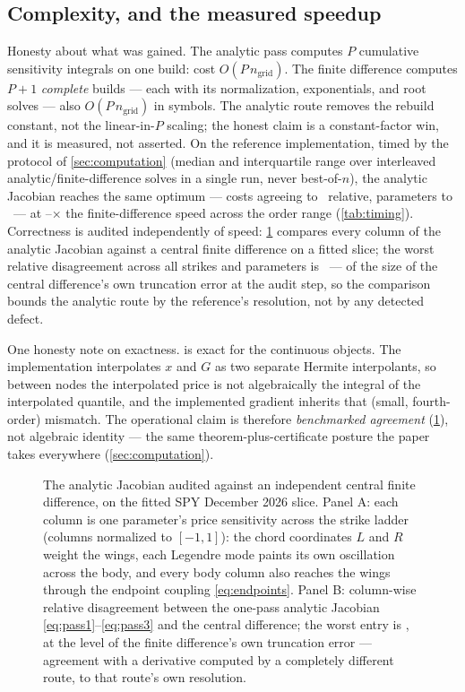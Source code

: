 \subsection{Complexity, and the measured speedup}

Honesty about what was gained.  The analytic pass computes $P$ cumulative
sensitivity integrals on one build: cost $O(P\,n_{\mathrm{grid}})$.  The
finite difference computes $P+1$ \emph{complete} builds --- each with its
normalization, exponentials, and root solves --- also
$O(P\,n_{\mathrm{grid}})$ in symbols.  The analytic route removes the
rebuild constant, not the linear-in-$P$ scaling; the honest claim is a
constant-factor win, and it is measured, not asserted.  On the reference
implementation, timed by the protocol of \cref{sec:computation} (median
and interquartile range over interleaved analytic/finite-difference
solves in a single run, never best-of-$n$), the analytic Jacobian reaches
the same optimum --- costs agreeing to \MacJacSameOptCost\ relative,
parameters to \MacJacSameOptParams\ --- at
\MacJacSpeedupMin--\MacJacSpeedupMax$\times$
the finite-difference speed across the order range
(\cref{tab:timing}).  Correctness is audited independently of speed:
\cref{fig:jacobian} compares every column of the analytic Jacobian
against a central finite difference on a fitted slice; the worst relative
disagreement across all strikes and parameters is \MacJacFdMaxRel\ ---
of the size of the central difference's own truncation error at the
audit step, so the comparison bounds the analytic route by the
reference's resolution, not by any detected defect.

One honesty note on exactness.   is exact for the
continuous objects.  The implementation interpolates $x$ and $G$ as two
separate Hermite interpolants, so between nodes the interpolated price is
not algebraically the integral of the interpolated quantile, and the
implemented gradient inherits that (small, fourth-order) mismatch.  The
operational claim is therefore \emph{benchmarked agreement}
(\cref{fig:jacobian}), not algebraic identity --- the same
theorem-plus-certificate posture the paper takes everywhere
(\cref{sec:computation}).

\begin{figure}[htbp]
\centering
{}
\caption{The analytic Jacobian audited against an independent central
finite difference, on the fitted SPY December 2026 slice.  Panel A: each
column is one parameter's price sensitivity across the strike ladder
(columns normalized to $[-1,1]$): the chord coordinates $L$ and $R$ weight
the wings, each Legendre mode paints its own oscillation across the body,
and every body column also reaches the wings through the endpoint coupling
\eqref{eq:endpoints}.  Panel B: column-wise relative disagreement between
the one-pass analytic Jacobian \eqref{eq:pass1}--\eqref{eq:pass3} and the
central difference; the worst entry is \MacJacFdMaxRel, at the level of
the finite difference's own truncation error --- agreement with a
derivative computed by a completely different route, to that route's own
resolution.}
\label{fig:jacobian}
\end{figure}
